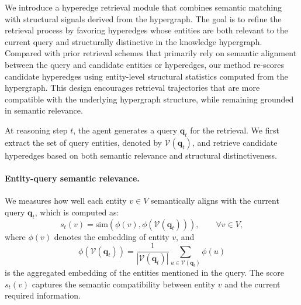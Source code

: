 
We introduce a hyperedge retrieval module that combines semantic matching with structural signals derived from the hypergraph.
The goal is to refine the retrieval process by favoring hyperedges whose entities are both relevant to the current query and structurally distinctive in the knowledge hypergraph.
Compared with prior retrieval schemes that primarily rely on semantic alignment between the query and candidate entities or hyperedges, our method re-scores candidate hyperedges using entity-level structural statistics computed from the hypergraph. 
This design encourages retrieval trajectories that are more compatible with the underlying hypergraph structure, while remaining grounded in semantic relevance.

At reasoning step $t$, the agent generates a query $\mathbf{q}_t$ for the retrieval.
We first extract the set of query entities, denoted by $\mathcal{V}(\mathbf{q}_t)$, and retrieve candidate hyperedges based on both semantic relevance and structural distinctiveness.

\paragraph{Entity-query semantic relevance.}
We measures how well each entity $v \in V$ semantically aligns with the current query $\boldsymbol{q}_t$, which is computed as:
\begin{equation}
    s_t\left(v\right) = \mathrm{sim}\!\left(\phi(v), \phi \left(\mathcal{V}\left(\mathbf{q}_t\right)\right)\right), \qquad \forall v \in V,
\end{equation}
where $\phi(v)$ denotes the embedding of entity $v$, and
\begin{equation}
    \phi\left(\mathcal{V}\left(\mathbf{q}_t\right)\right) = \frac{1}{\left\lvert \mathcal{V}\left(\mathbf{q}_t \right)\right\rvert} \sum_{u \in \mathcal{V}\left(\mathbf{q}_t \right)} \phi \left(u \right)
\end{equation}
is the aggregated embedding of the entities mentioned in the query.
The score $s_t(v)$ captures the semantic compatibility between entity $v$ and the current required information.

